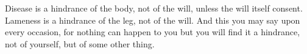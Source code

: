 Disease is  a hindrance of the  body, not of  the will, unless the  will itself
consent. Lameness is a hindrance of the leg,  not of the will. And this you may
say upon every occasion,  for nothing can happen to you but you  will find it a
hindrance, not of yourself, but of some other thing.
